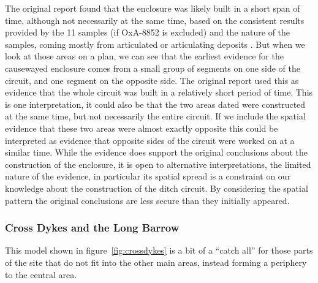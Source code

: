 The original report found that the enclosure was likely built in a short span of time, although not necessarily at the same time, based on the consistent results provided by the 11 samples (if OxA-8852 is excluded) and the nature of the samples, coming mostly from articulated or articulating deposits \citep[401]{Mercer:2008fk}. But when we look at those areas on a plan, we can see that the earliest evidence for the causewayed enclosure comes from a small group of segments on one side of the circuit, and one segment on the opposite side. The original report used this as evidence that the whole circuit was built in a relatively short period of time. This is one interpretation, it could also be that the two areas dated were constructed at the same time, but not necessarily the entire circuit. If we include the spatial evidence that these two areas were almost exactly opposite this could be interpreted as evidence that opposite sides of the circuit were worked on at a similar time. While the evidence does support the original conclusions about the construction of the enclosure, it is open to alternative interpretations, the limited nature of the evidence, in particular its spatial spread is a constraint on our knowledge about the construction of the ditch circuit. By considering the spatial pattern the original conclusions are less secure than they initially appeared. 

\subsubsection{Cross Dykes and the Long Barrow}
This model shown in figure~\ref{fig:crossdykes} is a bit of a ``catch all'' for those parts of the site that do not fit into the other main areas, instead forming a periphery to the central area.

